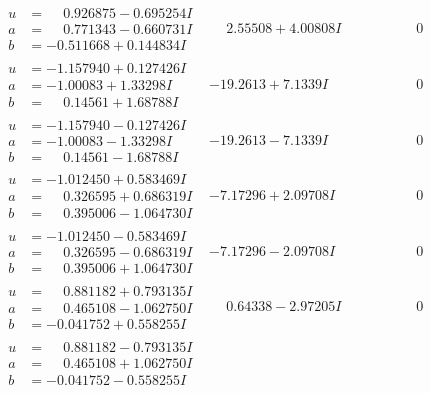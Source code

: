 \documentclass[1p]{elsarticle_modified}
\theoremstyle{definition}
\begin{document}
$$\begin{array}{c|c|c}
\begin{aligned}
u &= \phantom{-}0.926875 - 0.695254 I \\
a &= \phantom{-}0.771343 - 0.660731 I \\
b &= -0.511668 + 0.144834 I\end{aligned}
 & \phantom{-}2.55508 + 4.00808 I & \phantom{-0.000000 } 0 \\ \hline\begin{aligned}
u &= -1.157940 + 0.127426 I \\
a &= -1.00083 + 1.33298 I \\
b &= \phantom{-}0.14561 + 1.68788 I\end{aligned}
 & -19.2613 + 7.1339 I & \phantom{-0.000000 } 0 \\ \hline\begin{aligned}
u &= -1.157940 - 0.127426 I \\
a &= -1.00083 - 1.33298 I \\
b &= \phantom{-}0.14561 - 1.68788 I\end{aligned}
 & -19.2613 - 7.1339 I & \phantom{-0.000000 } 0 \\ \hline\begin{aligned}
u &= -1.012450 + 0.583469 I \\
a &= \phantom{-}0.326595 + 0.686319 I \\
b &= \phantom{-}0.395006 - 1.064730 I\end{aligned}
 & -7.17296 + 2.09708 I & \phantom{-0.000000 } 0 \\ \hline\begin{aligned}
u &= -1.012450 - 0.583469 I \\
a &= \phantom{-}0.326595 - 0.686319 I \\
b &= \phantom{-}0.395006 + 1.064730 I\end{aligned}
 & -7.17296 - 2.09708 I & \phantom{-0.000000 } 0 \\ \hline\begin{aligned}
u &= \phantom{-}0.881182 + 0.793135 I \\
a &= \phantom{-}0.465108 - 1.062750 I \\
b &= -0.041752 + 0.558255 I\end{aligned}
 & \phantom{-}0.64338 - 2.97205 I & \phantom{-0.000000 } 0 \\ \hline\begin{aligned}
u &= \phantom{-}0.881182 - 0.793135 I \\
a &= \phantom{-}0.465108 + 1.062750 I \\
b &= -0.041752 - 0.558255 I\end{aligned}

\end{array}$$
\end{document}
